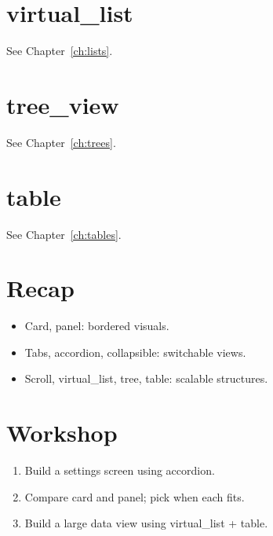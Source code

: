 \section{virtual\_list}

See Chapter~\ref{ch:lists}.

\section{tree\_view}

See Chapter~\ref{ch:trees}.

\section{table}

See Chapter~\ref{ch:tables}.

\section{Recap}

\begin{recap}
\begin{itemize}[leftmargin=*]
  \item Card, panel: bordered visuals.
  \item Tabs, accordion, collapsible: switchable views.
  \item Scroll, virtual\_list, tree, table: scalable
    structures.
\end{itemize}
\end{recap}

\section*{Workshop}

\begin{enumerate}[leftmargin=*]
  \item Build a settings screen using accordion.
  \item Compare card and panel; pick when each fits.
  \item Build a large data view using virtual\_list +
    table.
\end{enumerate}

